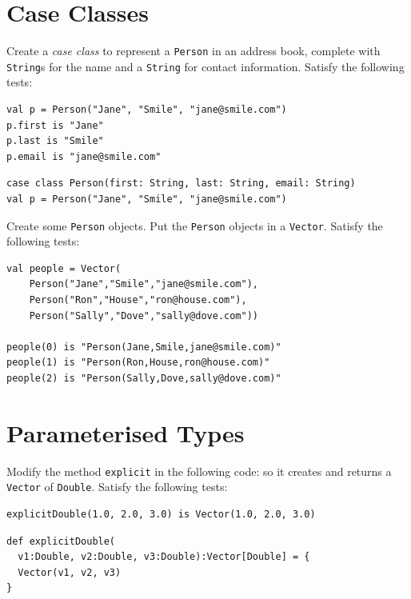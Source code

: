 \documentclass[a4paper,12pt]{exam}
\begin{document}
\begin{questions}
\section*{Case Classes}

\question
Create a \emph{case class} to represent a \texttt{Person} in an address book, 
complete with \texttt{String}s for the name and a \texttt{String} for contact information. 
Satisfy the following tests:
\begin{Verbatim}
val p = Person("Jane", "Smile", "jane@smile.com")
p.first is "Jane"
p.last is "Smile"
p.email is "jane@smile.com"
\end{Verbatim}

\begin{solution}
\begin{Verbatim}
case class Person(first: String, last: String, email: String)
val p = Person("Jane", "Smile", "jane@smile.com")	
\end{Verbatim}	
\end{solution}

\question
Create some \texttt{Person} objects. 
Put the \texttt{Person} objects in a \texttt{Vector}. 
Satisfy the following tests:
\begin{Verbatim}
val people = Vector( 
    Person("Jane","Smile","jane@smile.com"), 
    Person("Ron","House","ron@house.com"), 
    Person("Sally","Dove","sally@dove.com"))

people(0) is "Person(Jane,Smile,jane@smile.com)"
people(1) is "Person(Ron,House,ron@house.com)" 
people(2) is "Person(Sally,Dove,sally@dove.com)"
\end{Verbatim}

\begin{solution}
\end{solution}

\section*{Parameterised Types}

\question
Modify the method \texttt{explicit} in the following code:
so it creates and returns a \texttt{Vector} of \texttt{Double}. 
Satisfy the following tests: 
\begin{Verbatim}
explicitDouble(1.0, 2.0, 3.0) is Vector(1.0, 2.0, 3.0)
\end{Verbatim}

\begin{solution}
\begin{Verbatim}
def explicitDouble(
  v1:Double, v2:Double, v3:Double):Vector[Double] = {
  Vector(v1, v2, v3)
}	
\end{Verbatim}	
\end{solution}


\end{questions}
\end{document}
